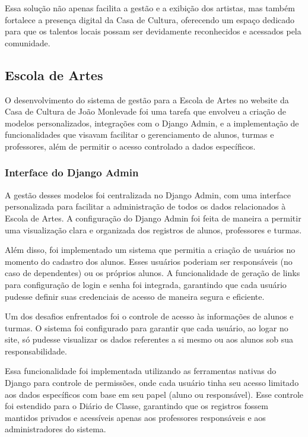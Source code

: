 Essa solução não apenas facilita a gestão e a exibição dos artistas, mas também fortalece a presença digital da Casa de Cultura, oferecendo um espaço dedicado para que os talentos locais possam ser devidamente reconhecidos e acessados pela comunidade.

\subsection{Escola de Artes}

O desenvolvimento do sistema de gestão para a Escola de Artes no website da Casa de Cultura de João Monlevade foi uma tarefa que envolveu a criação de modelos personalizados, integrações com o Django Admin, e a implementação de funcionalidades que visavam facilitar o gerenciamento de alunos, turmas e professores, além de permitir o acesso controlado a dados específicos.

\subsubsection{Interface do Django Admin}

A gestão desses modelos foi centralizada no Django Admin, com uma interface personalizada para facilitar a administração de todos os dados relacionados à Escola de Artes. A configuração do Django Admin foi feita de maneira a permitir uma visualização clara e organizada dos registros de alunos, professores e turmas.

Além disso, foi implementado um sistema que permitia a criação de usuários no momento do cadastro dos alunos. Esses usuários poderiam ser responsáveis (no caso de dependentes) ou os próprios alunos. A funcionalidade de geração de links para configuração de login e senha foi integrada, garantindo que cada usuário pudesse definir suas credenciais de acesso de maneira segura e eficiente.

Um dos desafios enfrentados foi o controle de acesso às informações de alunos e turmas. O sistema foi configurado para garantir que cada usuário, ao logar no site, só pudesse visualizar os dados referentes a si mesmo ou aos alunos sob sua responsabilidade.

Essa funcionalidade foi implementada utilizando as ferramentas nativas do Django para controle de permissões, onde cada usuário tinha seu acesso limitado aos dados específicos com base em seu papel (aluno ou responsável). Esse controle foi estendido para o Diário de Classe, garantindo que os registros fossem mantidos privados e acessíveis apenas aos professores responsáveis e aos administradores do sistema.

